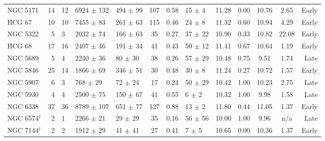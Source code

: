 \begin{table*}
\begin{center}
\begin{tabular}{@{}lr@{\hspace{0.1cm}}lllccl@{\hspace{0.2cm}}ccc@{\hspace{0.2cm}}c@{\hspace{0.2cm}}r@{}}
NGC 5171              &  14  &  12                    &  6924 $\pm$ 132  &  494 $\pm$ 99   &  107       &  0.58      &  15   $\pm$ 4   &  11.28          &  0.00  &  10.76          &  2.65   &  Early    \\
HCG 67                &  10  &  10                    &  7455 $\pm$ 83   &  261 $\pm$ 63   &  115       &  0.46      &  24   $\pm$ 8   &  11.32          &  0.60  &  10.94          &  4.29   &  Early    \\
NGC 5322              &  5   &  3                     &  2032 $\pm$ 74   &  166 $\pm$ 63   &  35        &  0.27      &  37   $\pm$ 22  &  10.90          &  0.33  &  10.82          &  22.08  &  Early    \\
HCG 68                &  17  &  16                    &  2407 $\pm$ 46   &  191 $\pm$ 34   &  41        &  0.43      &  50   $\pm$ 12  &  11.41          &  0.67  &  10.64          &  1.19   &  Early    \\
NGC 5689              &  5   &  4                     &  2240 $\pm$ 36   &  80  $\pm$ 30   &  38        &  0.26      &  57   $\pm$ 29  &  10.48          &  0.75  &  9.51           &  1.74   &  Late     \\
NGC 5846              &  25  &  14                    &  1866 $\pm$ 69   &  346 $\pm$ 51   &  30        &  0.48      &  30   $\pm$ 8   &  11.24          &  0.27  &  10.72          &  1.57   &  Early    \\
NGC 5907              &  6   &  3                     &  768  $\pm$ 29   &  72  $\pm$ 24   &  17        &  0.24      &  50   $\pm$ 29  &  10.42          &  1.00  &  10.23          &  2.75   &  Late     \\
NGC 5930              &  4   &  4                     &  2500 $\pm$ 75   &  150 $\pm$ 67   &  41        &  0.55      &  6    $\pm$ 2   &  10.32          &  1.00  &  9.98           &  1.58   &  Late     \\
NGC 6338              &  37  &  36                    &  8789 $\pm$ 107  &  651 $\pm$ 77   &  127       &  0.88      &  13   $\pm$ 2   &  11.80          &  0.44  &  11.05          &  1.37   &  Early    \\
NGC 6574$^{\dagger}$  &  2   &  1                     &  2266 $\pm$ 21   &  29  $\pm$ 29   &  35        &  0.16      &  56   $\pm$ 56  &  10.00          &  1.00  &  9.96           &  n/a    &  Late     \\
NGC 7144$^{\dagger}$  &  2   &  2                     &  1912 $\pm$ 29   &  41  $\pm$ 41   &  27        &  0.41      &  7    $\pm$ 5   &  10.65          &  0.00  &  10.36          &  1.37   &  Early    \\

\end{tabular}
\end{center}
\end{table*}
